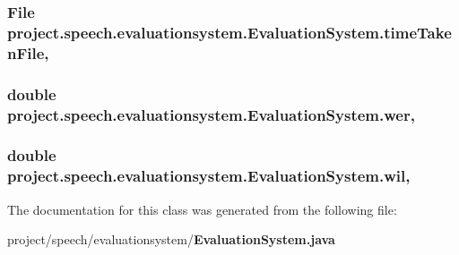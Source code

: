 \subsubsection[{time\+Taken\+File}]{\setlength{\rightskip}{0pt plus 5cm}File project.\+speech.\+evaluationsystem.\+Evaluation\+System.\+time\+Taken\+File\hspace{0.3cm}{\ttfamily [static]}, {\ttfamily [private]}}\label{classproject_1_1speech_1_1evaluationsystem_1_1_evaluation_system_a50fb70d5f996704fc8d75d3f4574145d}
\subsubsection[{wer}]{\setlength{\rightskip}{0pt plus 5cm}double project.\+speech.\+evaluationsystem.\+Evaluation\+System.\+wer\hspace{0.3cm}{\ttfamily [static]}, {\ttfamily [private]}}\label{classproject_1_1speech_1_1evaluationsystem_1_1_evaluation_system_a90b99fea095474bfb0ba8e39eb14da1b}
\subsubsection[{wil}]{\setlength{\rightskip}{0pt plus 5cm}double project.\+speech.\+evaluationsystem.\+Evaluation\+System.\+wil\hspace{0.3cm}{\ttfamily [static]}, {\ttfamily [private]}}\label{classproject_1_1speech_1_1evaluationsystem_1_1_evaluation_system_ac98b7bfe554c1c57b7a0abca5bbbd2ee}


The documentation for this class was generated from the following file\+:\begin{DoxyCompactItemize}
\item 
project/speech/evaluationsystem/{\bf Evaluation\+System.\+java}\end{DoxyCompactItemize}
